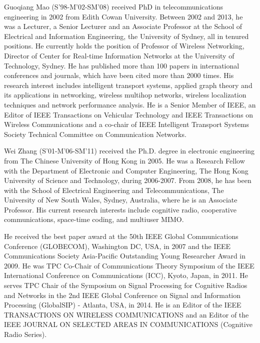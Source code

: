 \documentclass[english]{IEEEtran}
\theoremstyle{plain}
\theoremstyle{plain}
\theoremstyle{plain}
\theoremstyle{remark}
\begin{document}
\begin{IEEEbiography}
{Guoqiang Mao} (S'98-M'02-SM'08) received PhD in telecommunications engineering in 2002 from Edith Cowan University. Between 2002 and 2013, he was a Lecturer, a Senior Lecturer and an Associate Professor at the School of Electrical and Information Engineering, the University of Sydney, all in tenured positions. He currently holds the position of Professor of Wireless Networking, Director of Center for Real-time Information Networks at the University of Technology, Sydney. He has published more than 100 papers in international conferences and journals, which have been cited more than 2000 times. His research interest includes intelligent transport systems, applied graph theory and its applications in networking, wireless multihop networks, wireless localization techniques and network performance analysis. He is a Senior Member of IEEE, an Editor of IEEE Transactions on Vehicular Technology and IEEE Transactions on Wireless Communications and a co-chair of IEEE Intelligent Transport Systems Society Technical Committee on Communication Networks.
\end{IEEEbiography}

\begin{IEEEbiography}
{Wei Zhang}
(S'01-M'06-SM'11) received the Ph.D. degree in electronic engineering from The Chinese University of Hong Kong in 2005. He was a Research Fellow with the Department of Electronic and Computer Engineering, The Hong Kong University of Science and Technology, during 2006-2007. From 2008, he has been with the School of Electrical Engineering and Telecommunications, The University of New South Wales, Sydney, Australia, where he is an Associate Professor. His current research interests include cognitive radio, cooperative communications, space-time coding, and multiuser MIMO.

He received the best paper award at the 50th IEEE Global Communications Conference (GLOBECOM), Washington DC, USA, in 2007 and the IEEE Communications Society Asia-Pacific Outstanding Young Researcher Award in 2009. He was TPC Co-Chair of Communications Theory Symposium of the IEEE International Conference on Communications (ICC), Kyoto, Japan, in 2011. He serves TPC Chair of the Symposium on Signal Processing for Cognitive Radios and Networks in the 2nd IEEE Global Conference on Signal and Information Processing (GlobalSIP) -  Atlanta, USA, in 2014. He is an Editor of the IEEE TRANSACTIONS ON WIRELESS COMMUNICATIONS and an Editor of the IEEE JOURNAL ON SELECTED AREAS IN COMMUNICATIONS (Cognitive Radio Series).
\end{IEEEbiography}
\end{document}

